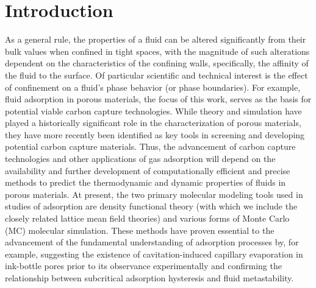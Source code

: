 \section{Introduction}\label{sec:intro}

As a general rule, the properties of a fluid can be altered significantly from their bulk values when confined in tight spaces, with the magnitude of such alterations dependent on the characteristics of the confining walls, specifically, the affinity of the fluid to the surface\cite{Gelb_Phase_1999}.
Of particular scientific and technical interest is the effect of confinement on a fluid's phase behavior (or phase boundaries)\cite{Gelb_Phase_1999,Rouquerol_Adsorption_1999,Lowell_Characterization_2004}.
For example, fluid adsorption in porous materials, the focus of this work, serves as the basis for potential viable carbon capture technologies\cite{Khoo_Life_2006,Maginn_What_2010,Meek_Metal_2010,Zhou_Introduction_2012}.
While theory and simulation have played a historically significant role in the characterization of porous materials\cite{Gelb_Phase_1999,Gubbins_role_2011,Monson_Understanding_2012}, they have more recently been identified as key tools in screening and developing potential carbon capture materials\cite{Yang_Molecular_2007,Watanabe_Accelerating_2012,Lin_In_2012}.
Thus, the advancement of carbon capture technologies and other applications of gas adsorption will depend on the availability and further development of computationally efficient and precise methods to predict the thermodynamic and dynamic properties of fluids in porous materials.
At present, the two primary molecular modeling tools used in studies of adsorption are density functional theory\cite{Evans_Density_1992} (with which we include the closely related lattice mean field theories\cite{Oliveira_Lattice-gas_1978,Marconi_Microscopic_1989,Kierlik_Capillary_2001,Siderius_Predicting_2009}) and various forms of Monte Carlo (MC) molecular simulation\cite{Allen_Computer_1987,Frenkel_Understanding_1996}.
These methods have proven essential to the advancement of the fundamental understanding of adsorption processes\cite{Gubbins_role_2011} by, for example, suggesting the existence of cavitation-induced capillary evaporation in ink-bottle pores prior to its observance experimentally\cite{Sarkisov_Modeling_2001} and confirming the relationship between subcritical adsorption hysteresis and fluid metastability\cite{Neimark_Adsorption_2000,Neimark_Capillary_2001}.
